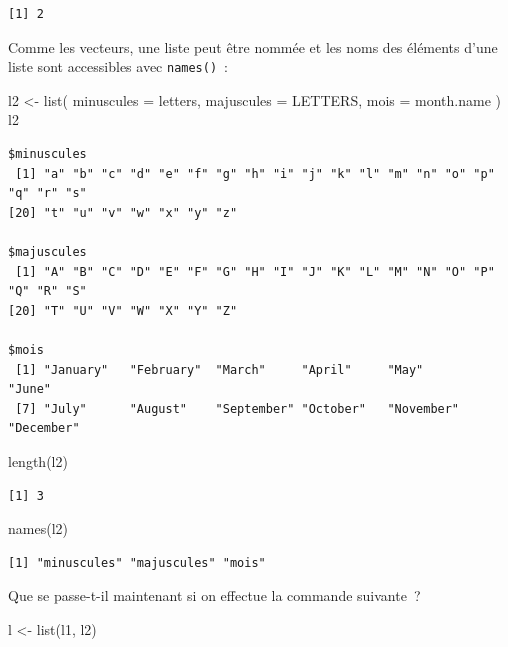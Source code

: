 \documentclass[
  letterpaper,
  DIV=11,
  numbers=noendperiod,
  oneside]{scrreprt}
\newenvironment{Shaded}{\begin{snugshade}}{\end{snugshade}}
\newcommand{\AttributeTok}[1]{\textcolor[rgb]{0.40,0.45,0.13}{#1}}
\newcommand{\FunctionTok}[1]{\textcolor[rgb]{0.28,0.35,0.67}{#1}}
\newcommand{\NormalTok}[1]{\textcolor[rgb]{0.00,0.23,0.31}{#1}}
\newcommand{\OtherTok}[1]{\textcolor[rgb]{0.00,0.23,0.31}{#1}}
\begin{document}
\begin{verbatim}
[1] 2
\end{verbatim}

Comme les vecteurs, une liste peut être nommée et les noms des éléments
d'une liste sont accessibles avec \texttt{names()}~:

\begin{Shaded}
\begin{Highlighting}[]
\NormalTok{l2 }\OtherTok{\textless{}{-}} \FunctionTok{list}\NormalTok{(}
  \AttributeTok{minuscules =}\NormalTok{ letters, }
  \AttributeTok{majuscules =}\NormalTok{ LETTERS, }
  \AttributeTok{mois =}\NormalTok{ month.name}
\NormalTok{)}
\NormalTok{l2}
\end{Highlighting}
\end{Shaded}

\begin{verbatim}
$minuscules
 [1] "a" "b" "c" "d" "e" "f" "g" "h" "i" "j" "k" "l" "m" "n" "o" "p" "q" "r" "s"
[20] "t" "u" "v" "w" "x" "y" "z"

$majuscules
 [1] "A" "B" "C" "D" "E" "F" "G" "H" "I" "J" "K" "L" "M" "N" "O" "P" "Q" "R" "S"
[20] "T" "U" "V" "W" "X" "Y" "Z"

$mois
 [1] "January"   "February"  "March"     "April"     "May"       "June"     
 [7] "July"      "August"    "September" "October"   "November"  "December" 
\end{verbatim}

\begin{Shaded}
\begin{Highlighting}[]
\FunctionTok{length}\NormalTok{(l2)}
\end{Highlighting}
\end{Shaded}

\begin{verbatim}
[1] 3
\end{verbatim}

\begin{Shaded}
\begin{Highlighting}[]
\FunctionTok{names}\NormalTok{(l2)}
\end{Highlighting}
\end{Shaded}

\begin{verbatim}
[1] "minuscules" "majuscules" "mois"      
\end{verbatim}

Que se passe-t-il maintenant si on effectue la commande suivante~?

\begin{Shaded}
\begin{Highlighting}[]
\NormalTok{l }\OtherTok{\textless{}{-}} \FunctionTok{list}\NormalTok{(l1, l2)}
\end{Highlighting}
\end{Shaded}
\end{document}
